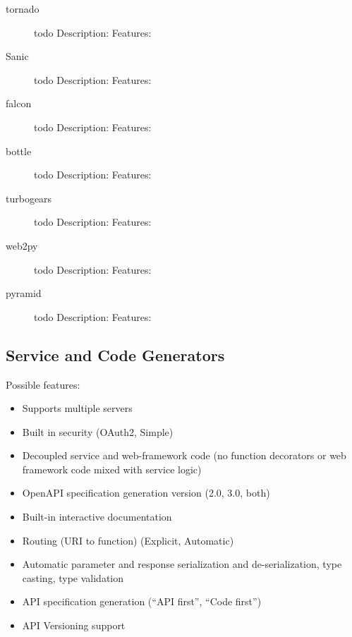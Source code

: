 \documentclass[conference]{IEEEtran}
\begin{document}
\begin{description}

\item[tornado] todo \cite{www-tornado}
Description:
Features:

\item[Sanic] todo \cite{www-sanic}
Description:
Features:

\item[falcon] todo \cite{www-falcon}
Description:
Features:

\item[bottle] todo \cite{www-bottle}
Description:
Features:

\item[turbogears] todo \cite{www-turbogears}
Description:
Features:

\item[web2py] todo \cite{www-web2py}
Description:
Features:

\item[pyramid] todo \cite{www-pyramid}
Description:
Features:

\end{description}

\subsection{Service and Code Generators} 

Possible features:
\begin{itemize}

\item Supports multiple servers

\item Built in security (OAuth2, Simple)

\item Decoupled service and web-framework code (no function decorators or web framework code mixed with service logic)

\item OpenAPI specification generation version (2.0, 3.0, both)

\item Built-in interactive documentation

\item Routing (URI to function) (Explicit, Automatic)

\item Automatic parameter and response serialization and de-serialization, type casting, type validation

\item API specification generation (``API first'', ``Code first'')

\item API Versioning support

\end{itemize}
\end{document}
